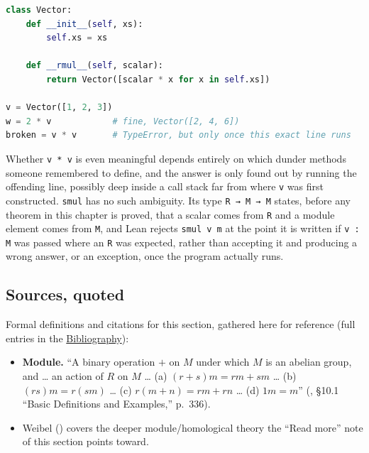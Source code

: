 \begin{lstlisting}[language=Python,style=python]
class Vector:
    def __init__(self, xs):
        self.xs = xs

    def __rmul__(self, scalar):
        return Vector([scalar * x for x in self.xs])

v = Vector([1, 2, 3])
w = 2 * v            # fine, Vector([2, 4, 6])
broken = v * v       # TypeError, but only once this exact line runs
\end{lstlisting}

Whether \texttt{v * v} is even meaningful depends entirely on which dunder methods someone remembered to define, and the answer is only found out by running the offending line, possibly deep inside a call stack far from where \texttt{v} was first constructed. \texttt{smul} has no such ambiguity. Its type \texttt{R → M → M} states, before any theorem in this chapter is proved, that a scalar comes from \texttt{R} and a module element comes from \texttt{M}, and Lean rejects \texttt{smul v m} at the point it is written if \texttt{v : M} was passed where an \texttt{R} was expected, rather than accepting it and producing a wrong answer, or an exception, once the program actually runs.

\subsection{Sources, quoted}\label{sec:11-modules:02-translating-into-lean:2}

Formal definitions and citations for this section, gathered here for reference (full entries in the \hyperref[sec:root:bibliography:1]{Bibliography}):

\begin{itemize}
\tightlist
\item
  \textbf{Module.} ``A binary operation \(+\) on \(M\) under which \(M\) is an abelian group, and \ldots{} an action of \(R\) on \(M\) \ldots{} (a) \((r+s)m = rm+sm\) \ldots{} (b) \((rs)m = r(sm)\) \ldots{} (c) \(r(m+n) = rm+rn\) \ldots{} (d) \(1m = m\)'' (\cite{DummitFoote2003}, §10.1 ``Basic Definitions and Examples,'' p.~336).
\item
  Weibel (\cite{Weibel1994}) covers the deeper module/homological theory the ``Read more'' note of this section points toward.
\end{itemize}

